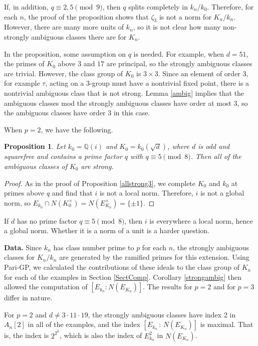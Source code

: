 \documentclass{amsart}
\newtheorem{proposition}[theorem]{Proposition}
\begin{document}
If, in addition, $q\equiv 2, 5 \pmod 9$, then $q$ splits completely in $k_n/k_0$. Therefore, for each $n$, 
the proof of the proposition
shows that $\zeta_3$ is not a norm for $K_n/k_n$. However, there are many more units of $k_n$, so
it is not clear how many non-strongly ambiguous classes there are for $K_n$. 

In the proposition, some assumption on $q$ is needed. For example, when $d=51$, the primes of $K_0$ above $3$ and $17$
are principal, so the strongly ambiguous classes are trivial. However, the  class group of $K_0$
is $3\times 3$. Since an element of order 3,  for example $\tau$, acting on a 3-group must have a nontrivial
fixed point, there is a nontrivial ambiguous class that is not strong. Lemma \ref{ambig} implies that
the ambiguous classes mod the strongly ambiguous classes have order at most 3, so the ambiguous classes
have order 3 in this case.


When $p=2$, we have the following.
\begin{proposition}\label{allstrong2}  Let $k_0=\mathbb Q(i)$ and $K_0=k_0(\sqrt{d})$, where $d$
is odd and squarefree and contains a prime factor $q$ with  $q\equiv 5\pmod 8$. Then all of the ambiguous classes of $K_0$
are strong. 
\end{proposition}
\begin{proof} As in the proof of Proposition \ref{allstrong3}, we complete $K_0$ and $k_0$ at primes above $q$
and find that $i$ is not a local norm. Therefore, $i$ is not a global norm, so $E_{k_0}\cap N(K_0^{\times}) = N(E_{K_0}^{\times})= \{\pm 1\}$.
\end{proof}

If $d$ has no prime factor $q\equiv 5\pmod 8$, then $i$ is everywhere a local norm, hence a global norm.
Whether it is a norm of a unit is a harder question. 


\medskip

{\bf Data.} Since $k_n$ has class number prime to $p$ for each $n$, the strongly ambiguous classes for $K_n/k_n$ are generated by the ramified primes
for this extension. Using Pari-GP, we calculated the contributions of these ideals to the class group of $K_n$ for each of the examples
in Section \ref{SectComp}. Corollary \ref{strongambig} then allowed the computation of $[E_{k_n} : N(E_{K_n})]$. 
The results for $p=2$ and for $p=3$ differ in nature.

For $p=2$ and $d\ne 3\cdot 11\cdot 19$, the strongly ambiguous classes have index 2 in $A_n[2]$ in all of the examples, and
the index $[E_{k_n} \, : \, N(E_{K_n})]$ is maximal. That is, the index is $2^{2^n}$, which is also the index of $E_{k_n}^2$ 
in $N(E_{K_n})$. 
\end{document}
